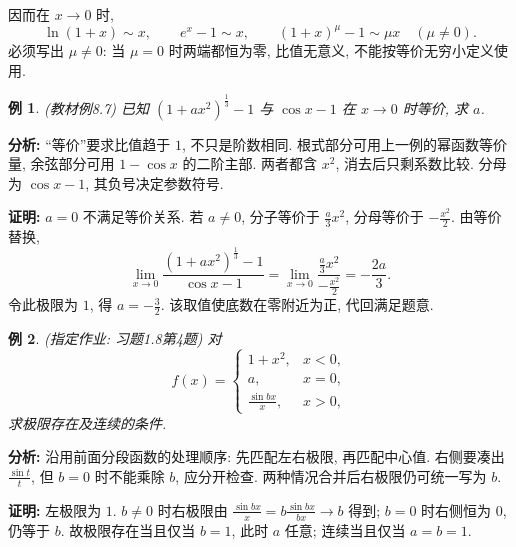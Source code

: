 \documentclass[UTF8,openany]{ctexbook}
\theoremstyle{chinesetextbook}
\newtheorem{example}{例}[section]
\newenvironment{cnproof}{\par\indent\textbf{证明:} \ignorespaces}{\par}
\begin{document}
因而在 $x\to0$ 时,
\[
\ln(1+x)\sim x,\qquad e^x-1\sim x,\qquad
(1+x)^\mu-1\sim\mu x\quad(\mu\ne0).
\]
必须写出 $\mu\ne0$: 当 $\mu=0$ 时两端都恒为零, 比值无意义, 不能按等价无穷小定义使用.
\begin{example}
(教材例8.7) 已知 $\displaystyle (1+ax^2)^{\frac13}-1$ 与 $\cos x-1$ 在 $x\to0$ 时等价, 求 $a$.
\end{example}
\par\indent\textbf{分析:} “等价”要求比值趋于 $1$, 不只是阶数相同. 根式部分可用上一例的幂函数等价量, 余弦部分可用 $1-\cos x$ 的二阶主部. 两者都含 $x^2$, 消去后只剩系数比较. 分母为 $\cos x-1$, 其负号决定参数符号.
\begin{cnproof}
$a=0$ 不满足等价关系. 若 $a\ne0$, 分子等价于 $\displaystyle \frac a3x^2$, 分母等价于 $\displaystyle -\frac{x^2}{2}$. 由等价替换,
\[
\lim_{x\to0}\frac{(1+ax^2)^{\frac13}-1}{\cos x-1}
=\lim_{x\to0}\frac{\frac a3x^2}{-\frac{x^2}2}=-\frac{2a}3.
\]
令此极限为 $1$, 得 $\displaystyle a=-\frac32$. 该取值使底数在零附近为正, 代回满足题意.
\end{cnproof}
\begin{example}
(指定作业: 习题1.8第4题) 对
\[
f(x)=\begin{cases}1+x^2,&x<0,\\a,&x=0,\\\frac{\sin bx}{x},&x>0,\end{cases}
\]
求极限存在及连续的条件.
\end{example}
\par\indent\textbf{分析:} 沿用前面分段函数的处理顺序: 先匹配左右极限, 再匹配中心值. 右侧要凑出 $\displaystyle\frac{\sin t}t$, 但 $b=0$ 时不能乘除 $b$, 应分开检查. 两种情况合并后右极限仍可统一写为 $b$.

\begin{cnproof}
左极限为 $1$. $b\ne0$ 时右极限由 $\displaystyle \frac{\sin bx}x=b\frac{\sin bx}{bx}\to b$ 得到; $b=0$ 时右侧恒为 $0$, 仍等于 $b$. 故极限存在当且仅当 $b=1$, 此时 $a$ 任意; 连续当且仅当 $a=b=1$.
\end{cnproof}
\end{document}
